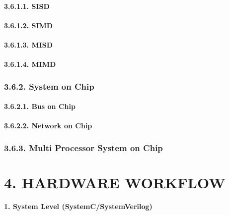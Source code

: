 \documentclass[
]{article}
\begin{document}
\hypertarget{sisd}{%
\paragraph{3.6.1.1. SISD}\label{sisd}}

\hypertarget{simd}{%
\paragraph{3.6.1.2. SIMD}\label{simd}}

\hypertarget{misd}{%
\paragraph{3.6.1.3. MISD}\label{misd}}

\hypertarget{mimd}{%
\paragraph{3.6.1.4. MIMD}\label{mimd}}

\hypertarget{system-on-chip}{%
\subsubsection{3.6.2. System on Chip}\label{system-on-chip}}

\hypertarget{bus-on-chip}{%
\paragraph{3.6.2.1. Bus on Chip}\label{bus-on-chip}}

\hypertarget{network-on-chip}{%
\paragraph{3.6.2.2. Network on Chip}\label{network-on-chip}}

\hypertarget{multi-processor-system-on-chip}{%
\subsubsection{3.6.3. Multi Processor System on
Chip}\label{multi-processor-system-on-chip}}

\hypertarget{hardware-workflow}{%
\section{4. HARDWARE WORKFLOW}\label{hardware-workflow}}

\textbf{1. System Level (SystemC/SystemVerilog)}
\end{document}
